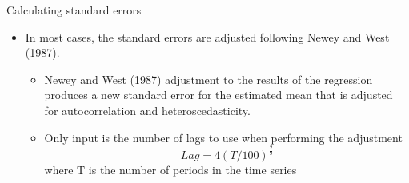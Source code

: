 \documentclass[handout]{beamer}
\begin{document}
	\begin{frame}{Calculating standard errors}
		\begin{itemize}
			\item In most cases, the standard errors are adjusted following Newey and West (1987).
			
			
			\begin{itemize}
				\item Newey and West (1987) adjustment to the results of the
				regression produces a new standard error for the estimated mean that is adjusted for autocorrelation and heteroscedasticity.
				
				\item Only input is the number of lags to use when performing the adjustment
				\begin{equation*}
					Lag = 4(T/100)^{\frac{2}{9}}
				\end{equation*}
				where T is the number of periods in the time series
			\end{itemize}
			
			
		\end{itemize}
		
		
				\hfill
				\hyperlink{Estimation}{}
	\end{frame}
	
	
	
\end{document}
